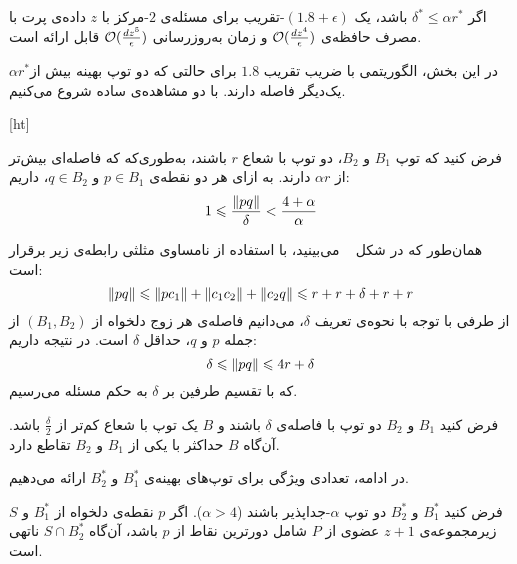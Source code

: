 
اگر $\delta^* \leq \alpha r^*$ باشد، یک $(1.8 + \epsilon)$-تقریب برای مسئله‌ی $2$-مرکز با $z$ داده‌ی پرت با مصرف حافظه‌ی $\mathcal{O}(\frac{dz^4}{\epsilon})$ و زمان به‌روزرسانی $\mathcal{O}(\frac{dz^5}{\epsilon})$ قابل ارائه است.



در این بخش، الگوریتمی با ضریب تقریب $1.8$ برای حالتی که دو توپ بهینه بیش از$\alpha r^*$  یک‌دیگر فاصله دارند. با دو مشاهده‌ی ساده شروع می‌کنیم.


[ht]

فرض کنید که توپ $B_1$ و $B_2$، دو توپ با شعاع $r$ باشند، به‌طوری‌که که فاصله‌ای بیش‌تر از $\alpha r$ دارند. به ازای هر دو نقطه‌ی $p \in B_1$ و $q \in B_2$، داریم:
$$1 \leqslant \frac{\|{pq}\|}{\delta} < \frac{4 + \alpha}{\alpha}$$


همان‌طور که در شکل ~ می‌بینید، با استفاده از نامساوی مثلثی رابطه‌ی زیر برقرار است:
$$\|{pq}\| \leqslant \|{pc_1}\| + \|{c_1c_2}\| + \|{c_2 q}\| \leqslant r + r + \delta + r + r$$ 
از‌ طرفی با توجه با نحوه‌ی تعریف $\delta$، می‌دانیم فاصله‌ی هر زوج دلخواه از $(B_1, B_2)$ از جمله $p$ و $q$، حداقل $\delta$ است. در نتیجه داریم:
$$\delta \leqslant \|{pq}\| \leqslant 4r + \delta$$
که با تقسیم طرفین بر $\delta$ به حکم مسئله می‌رسیم.



فرض کنید $B_1$ و $B_2$ دو توپ با فاصله‌ی $\delta$ باشند و $B$ یک توپ با شعاع کم‌تر از $\frac{\delta}{2}$ باشد. آن‌گاه $B$ حداکثر با یکی از $B_1$ و $B_2$ تقاطع دارد.


در ادامه، تعدادی ویژگی برای توپ‌های بهینه‌ی $B_1^*$ و $B_2^*$ ارائه می‌دهیم.


فرض کنید $B_1^*$ و $B_2^*$ دو توپ $\alpha$-جداپذیر باشند ($\alpha > 4$). اگر $p$ نقطه‌ی دلخواه از $B_1^*$ و $S$ زیرمجموعه‌ی $z+1$ عضوی از $P$ شامل دورترین نقاط از $p$ باشد، آن‌گاه $S \cap B_2^*$ ناتهی است.


